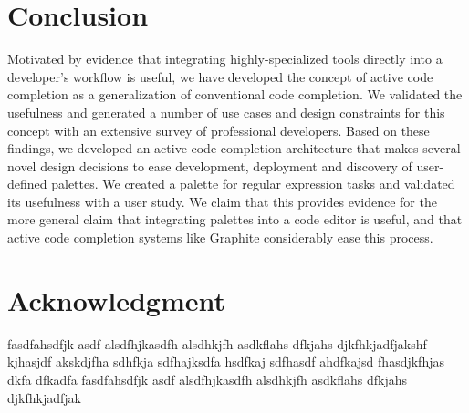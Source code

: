 \documentclass[10pt, conference, compsocconf]{IEEEtran}
\begin{document}
\section{Conclusion}
Motivated by evidence that integrating highly-specialized tools directly into a developer's workflow is useful, we have developed the concept of active code completion as a generalization of conventional code completion. We validated the usefulness and generated a number of use cases and design constraints for this concept with an extensive survey of professional developers. Based on these findings, we developed an active code completion architecture that makes several novel design decisions to ease development, deployment and discovery of user-defined palettes. We created a palette for regular expression tasks and validated its usefulness with a user study. We claim that this provides evidence for the more general claim that integrating palettes into a code editor is useful, and that active code completion systems like Graphite considerably ease this process.



\section*{Acknowledgment}

fasdfahsdfjk asdf alsdfhjkasdfh alsdhkjfh asdkflahs dfkjahs djkfhkjadfjakshf kjhasjdf akskdjfha sdhfkja sdfhajksdfa hsdfkaj sdfhasdf ahdfkajsd fhasdjkfhjas dkfa dfkadfa
fasdfahsdfjk asdf alsdfhjkasdfh alsdhkjfh asdkflahs dfkjahs djkfhkjadfjak


%
%
%

%
\balance 



\end{document}
